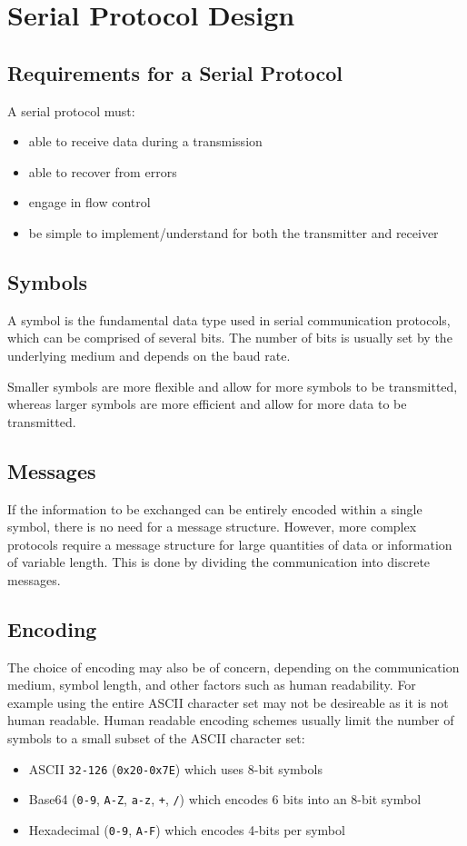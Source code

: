\documentclass[a4paper]{report}
\begin{document}
\section{Serial Protocol Design}
\subsection{Requirements for a Serial Protocol}
A serial protocol must:
\begin{itemize}
    \item able to receive data during a transmission
    \item able to recover from errors
    \item engage in flow control
    \item be simple to implement/understand for both the transmitter
          and receiver
\end{itemize}
\subsection{Symbols}
A symbol is the fundamental data type used in serial communication
protocols, which can be comprised of several bits. The number of bits
is usually set by the underlying medium and depends on the baud rate.

Smaller symbols are more flexible and allow for more symbols to be
transmitted, whereas larger symbols are more efficient and allow for
more data to be transmitted.
\subsection{Messages}
If the information to be exchanged can be entirely encoded within a
single symbol, there is no need for a message structure. However, more
complex protocols require a message structure for large quantities of
data or information of variable length. This is done by dividing the
communication into discrete messages.
\subsection{Encoding}
The choice of encoding may also be of concern, depending on the
communication medium, symbol length, and other factors such as human
readability. For example using the entire ASCII character set may not
be desireable as it is not human readable. Human readable encoding
schemes usually limit the number of symbols to a small subset of the
ASCII character set:
\begin{itemize}
    \item ASCII \texttt{32-126} (\texttt{0x20-0x7E})
          which uses 8-bit symbols %
    \item Base64 (\texttt{0-9}, \texttt{A-Z},
          \texttt{a-z}, \texttt{+}, \texttt{/})
          which encodes 6 bits into an 8-bit symbol %
    \item Hexadecimal (\texttt{0-9}, \texttt{A-F}) which
          encodes 4-bits per symbol %
\end{itemize}
\end{document}
